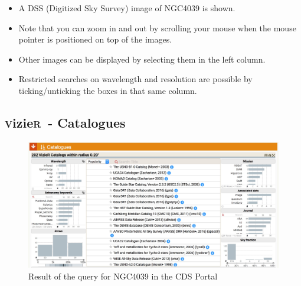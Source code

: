 \documentclass [a4paper, 12pt]{article}
\newcommand{\vizier}{{\textsc{v}izie\textsc{r}}}
\begin{document}
\begin{itemize}
\item A DSS (Digitized Sky Survey) image of NGC4039 is shown.
\item Note that you can zoom in and out by scrolling your mouse when the mouse 
pointer is positioned on top of the images. 
\item Other images can be displayed by selecting them in the left 
column. 
\item Restricted searches on wavelength and resolution are possible by 
ticking/unticking the boxes in that same column.
\end{itemize}


\subsection{\vizier\ - Catalogues}


\begin{figure}[H]
\center
\includegraphics[width=1  
\textwidth]{../images/cdsportal_catalogue-information_ngc4039.jpg}
\caption{Result of the query for NGC4039 in the CDS Portal}
\label{fig:cdsportal4}
\end{figure}
\end{document}
